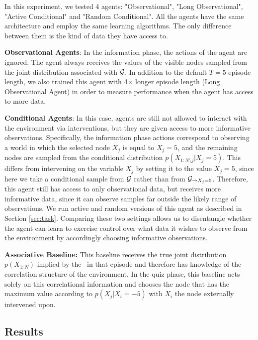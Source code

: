 In this experiment, we tested 4 agents: "Observational", "Long Observational", "Active Conditional" and "Random Conditional". All the agents have the same architecture and employ the same learning algorithms. The only difference between them is the kind of data they have access to.

\textbf{Observational Agents}: In the information phase, the actions of the agent are ignored.
The agent always receives the values of the visible nodes sampled from the joint distribution associated with ${\cal G}$. In addition to the default $T=5$ episode length, we also trained this agent with 4$\times$ longer episode length (Long Observational Agent) in order to measure performance when the agent has access to more data.

\textbf{Conditional Agents}:
In this case, agents are still not allowed to interact with the environment via interventions, but they are given access to more informative observations. Specifically, the information phase actions correspond to observing a world in which the selected node $X_j$ is equal to $X_j=5$, and the remaining nodes are sampled from the conditional distribution \(p(X_{1:N\setminus j }|X_j=5)\).
This differs from intervening on the variable $X_{j}$ by setting it to the value $X_{j}=5$, since here we take a conditional sample from ${\cal G}$ rather than from ${\cal G}_{\rightarrow X_j=5}$. %
Therefore, this agent still has access to only observational data, but receives more informative data, since it can observe samples far outside the likely range of observations. We run active and random versions of this agent as described in Section \ref{sec:task}. Comparing these two settings allows us to disentangle whether the agent can learn to exercise control over what data it wishes to observe from the environment by accordingly choosing informative observations.

\textbf{Associative Baseline:}
This baseline receives the true joint distribution $p(X_{1:N})$ implied by the \CBN~in that episode and therefore has knowledge of the correlation structure of the environment. In the quiz phase, this baseline acts solely on this correlational information and chooses the node that has the maximum value according to $p(X_j|X_i=-5)$ with $X_i$ the node externally intervened upon.

\subsection*{Results}

